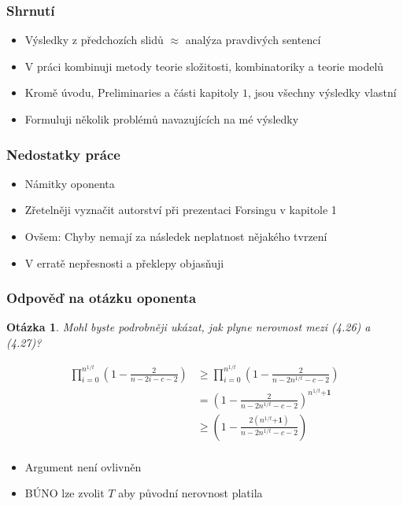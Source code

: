 \documentclass{beamer}
\newcommand{\0}{\textbf{0}}
\newcommand{\1}{\textbf{1}}
\newtheorem{ques}{Otázka}
\begin{document}
\begin{frame}
\frametitle{Shrnutí}
\begin{itemize}
\item Výsledky z předchozích slidů $\approx$ analýza pravdivých sentencí\pause
\item V práci kombinuji metody teorie složitosti, kombinatoriky a teorie modelů\pause
\item Kromě úvodu, Preliminaries a části kapitoly $1$, jsou všechny výsledky vlastní\pause
\item Formuluji několik problémů navazujících na mé výsledky
\end{itemize}
\end{frame}

\begin{frame}
\frametitle{Nedostatky práce}
\begin{itemize}
\item Námitky oponenta\pause
\item Zřetelněji vyznačit autorství při prezentaci Forsingu v kapitole 1\pause
\item Ovšem: Chyby nemají za následek neplatnost nějakého tvrzení\pause
\item V erratě nepřesnosti a překlepy objasňuji
\end{itemize}
\end{frame}

\begin{frame}
\frametitle{Odpověď na otázku oponenta}
\begin{ques}
Mohl byste podrobněji ukázat, jak plyne nerovnost mezi (4.26) a (4.27)?
\end{ques}\pause
\begin{align*}
\prod_{i=0}^{n^{1/t}}\left(1-\frac{2}{n-2i-c-2}\right)&\geq 
\prod_{i=0}^{n^{1/t}}\left(1-\frac{2}{n-2n^{1/t}-c-2}\right)\\
&=\left (1-\frac{2}{n-2n^{1/t}-c-2}\right)^{n^{1/t}\textbf{+1}}\\
&\geq\left (1-\frac{2(n^{1/t}\textbf{+1})}{n-2n^{1/t}-c-2}\right)\\
\end{align*}
\vspace{-4em}
\pause
\begin{itemize}
\item Argument není ovlivněn\pause
\item BÚNO lze zvolit $T$ aby původní nerovnost platila
\end{itemize}
\end{frame}

\begin{frame}
\begin{center}
\huge
{}
\end{center}
\end{frame}
\end{document}
